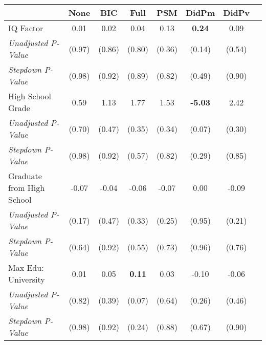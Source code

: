 \begin{tabular}{l c c c c c c c}
\toprule
 & None & BIC & Full & PSM & DidPm & DidPv \\
\midrule
IQ Factor & 0.01 & 0.02 & 0.04 & 0.13 & \textbf{ 0.24 } & 0.09 \\
\quad \textit{Unadjusted P-Value} & (0.97) & (0.86) & (0.80) & (0.36) & (0.14) & (0.54) \\
\quad \textit{Stepdown P-Value} & (0.98) & (0.92) & (0.89) & (0.82) & (0.49) & (0.90) \\
High School Grade & 0.59 & 1.13 & 1.77 & 1.53 & \textbf{ -5.03 } & 2.42 \\
\quad \textit{Unadjusted P-Value} & (0.70) & (0.47) & (0.35) & (0.34) & (0.07) & (0.30) \\
\quad \textit{Stepdown P-Value} & (0.98) & (0.92) & (0.57) & (0.82) & (0.29) & (0.85) \\
Graduate from High School & -0.07 & -0.04 & -0.06 & -0.07 & 0.00 & -0.09 \\
\quad \textit{Unadjusted P-Value} & (0.17) & (0.47) & (0.33) & (0.25) & (0.95) & (0.21) \\
\quad \textit{Stepdown P-Value} & (0.64) & (0.92) & (0.55) & (0.73) & (0.96) & (0.76) \\
Max Edu: University & 0.01 & 0.05 & \textbf{ 0.11 } & 0.03 & -0.10 & -0.06 \\
\quad \textit{Unadjusted P-Value} & (0.82) & (0.39) & (0.07) & (0.64) & (0.26) & (0.46) \\
\quad \textit{Stepdown P-Value} & (0.98) & (0.92) & (0.24) & (0.88) & (0.67) & (0.90) \\
\bottomrule
\end{tabular}
